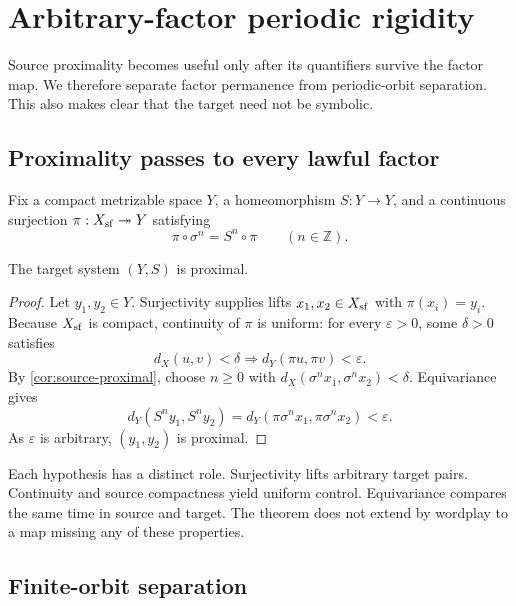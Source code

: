 \section{Arbitrary-factor periodic rigidity}
\label{sec:factor-rigidity}

Source proximality becomes useful only after its quantifiers survive the
factor map.  We therefore separate factor permanence from periodic-orbit
separation.  This also makes clear that the target need not be symbolic.

\subsection{Proximality passes to every lawful factor}

Fix a compact metrizable space \(Y\), a homeomorphism \(S:Y\to Y\), and a
continuous surjection \(\pi:X_{\mathrm{sf}}\twoheadrightarrow Y\) satisfying
\begin{equation}
  \pi\circ\sigma^n=S^n\circ\pi
  \qquad(n\in\mathbb Z).
  \label{eq:factor-equivariance}
\end{equation}

\begin{lemma}
\label{lem:factor-proximal}
The target system \((Y,S)\) is proximal.
\end{lemma}

\begin{proof}
Let \(y_1,y_2\in Y\).  Surjectivity supplies lifts
\(x_1,x_2\in X_{\mathrm{sf}}\) with \(\pi(x_i)=y_i\).  Because \(X_{\mathrm{sf}}\) is compact,
continuity of \(\pi\) is uniform: for every \(\varepsilon>0\), some
\(\delta>0\) satisfies
\[
  d_X(u,v)<\delta
  \Longrightarrow
  d_Y(\pi u,\pi v)<\varepsilon.
\]
By \cref{cor:source-proximal}, choose \(n\geq0\) with
\(d_X(\sigma^n x_1,\sigma^n x_2)<\delta\).  Equivariance gives
\[
  d_Y(S^n y_1,S^n y_2)
  =d_Y(\pi\sigma^n x_1,\pi\sigma^n x_2)<\varepsilon.
\]
As \(\varepsilon\) is arbitrary, \((y_1,y_2)\) is proximal.
\end{proof}

Each hypothesis has a distinct role.  Surjectivity lifts arbitrary target
pairs.  Continuity and source compactness yield uniform control.  Equivariance
compares the same time in source and target.  The theorem does not extend by
wordplay to a map missing any of these properties.

\subsection{Finite-orbit separation}

